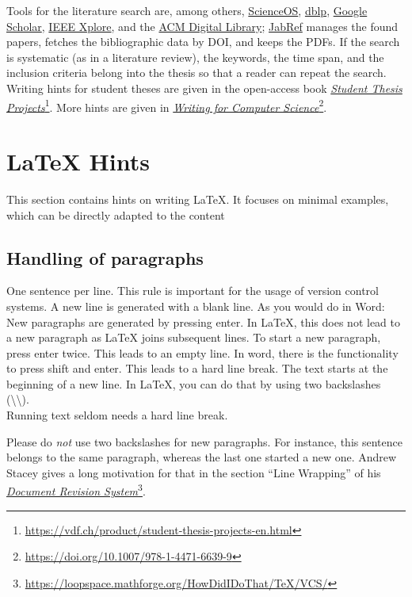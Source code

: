 Tools for the literature search are, among others, \href{https://www.scienceos.ai/}{ScienceOS}, \href{https://dblp.org/}{dblp}, \href{https://scholar.google.com/}{Google Scholar}, \href{https://ieeexplore.ieee.org/}{IEEE Xplore}, and the \href{https://dl.acm.org/}{ACM Digital Library}; \href{https://www.jabref.org/}{JabRef} manages the found papers, fetches the bibliographic data by DOI, and keeps the PDFs.
If the search is systematic (as in a literature review), the keywords, the time span, and the inclusion criteria belong into the thesis so that a reader can repeat the search.
Writing hints for student theses are given in the open-access book \href{https://vdf.ch/product/student-thesis-projects-en.html}{\emph{Student Thesis Projects}}\footnote{\url{https://vdf.ch/product/student-thesis-projects-en.html}}.
More hints are given in \href{https://doi.org/10.1007/978-1-4471-6639-9}{\emph{Writing for Computer Science}}\footnote{\url{https://doi.org/10.1007/978-1-4471-6639-9}}.

\ifluatex
\fi

\section{LaTeX Hints}
\label{sec:latexhints}

This section contains hints on writing LaTeX.
It focuses on minimal examples, which can be directly adapted to the content

\subsection{Handling of paragraphs}

\begin{ltgexample}
One sentence per line.
This rule is important for the usage of version control systems.
A new line is generated with a blank line.
As you would do in Word:
New paragraphs are generated by pressing enter.
In LaTeX, this does not lead to a new paragraph as LaTeX joins subsequent lines.
To start a new paragraph, press enter twice.
This leads to an empty line.
In word, there is the functionality to press shift and enter.
This leads to a hard line break.
The text starts at the beginning of a new line.
In LaTeX, you can do that by using two backslashes (\textbackslash\textbackslash).
\\
Running text seldom needs a hard line break.

Please do \textit{not} use two backslashes for new paragraphs.
For instance, this sentence belongs to the same paragraph, whereas the last one started a new one.
Andrew Stacey gives a long motivation for that in the section \enquote{Line Wrapping} of his \href{https://loopspace.mathforge.org/HowDidIDoThat/TeX/VCS/#section.3}{\emph{Document Revision System}}\footnote{\url{https://loopspace.mathforge.org/HowDidIDoThat/TeX/VCS/}}.
\end{ltgexample}

